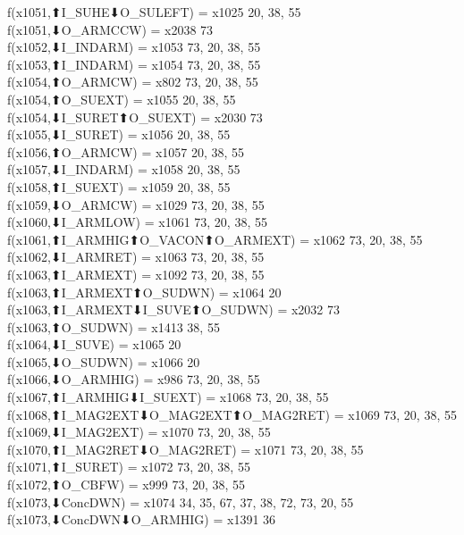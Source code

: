 f(x1051,⬆I_SUHE⬇O_SULEFT) = x1025 {20, 38, 55} \\
f(x1051,⬇O_ARMCCW) = x2038 {73} \\
f(x1052,⬇I_INDARM) = x1053 {73, 20, 38, 55} \\
f(x1053,⬆I_INDARM) = x1054 {73, 20, 38, 55} \\
f(x1054,⬆O_ARMCW) = x802 {73, 20, 38, 55} \\
f(x1054,⬆O_SUEXT) = x1055 {20, 38, 55} \\
f(x1054,⬇I_SURET⬆O_SUEXT) = x2030 {73} \\
f(x1055,⬇I_SURET) = x1056 {20, 38, 55} \\
f(x1056,⬆O_ARMCW) = x1057 {20, 38, 55} \\
f(x1057,⬇I_INDARM) = x1058 {20, 38, 55} \\
f(x1058,⬆I_SUEXT) = x1059 {20, 38, 55} \\
f(x1059,⬇O_ARMCW) = x1029 {73, 20, 38, 55} \\
f(x1060,⬇I_ARMLOW) = x1061 {73, 20, 38, 55} \\
f(x1061,⬆I_ARMHIG⬆O_VACON⬆O_ARMEXT) = x1062 {73, 20, 38, 55} \\
f(x1062,⬇I_ARMRET) = x1063 {73, 20, 38, 55} \\
f(x1063,⬆I_ARMEXT) = x1092 {73, 20, 38, 55} \\
f(x1063,⬆I_ARMEXT⬆O_SUDWN) = x1064 {20} \\
f(x1063,⬆I_ARMEXT⬇I_SUVE⬆O_SUDWN) = x2032 {73} \\
f(x1063,⬆O_SUDWN) = x1413 {38, 55} \\
f(x1064,⬇I_SUVE) = x1065 {20} \\
f(x1065,⬇O_SUDWN) = x1066 {20} \\
f(x1066,⬇O_ARMHIG) = x986 {73, 20, 38, 55} \\
f(x1067,⬆I_ARMHIG⬇I_SUEXT) = x1068 {73, 20, 38, 55} \\
f(x1068,⬆I_MAG2EXT⬇O_MAG2EXT⬆O_MAG2RET) = x1069 {73, 20, 38, 55} \\
f(x1069,⬇I_MAG2EXT) = x1070 {73, 20, 38, 55} \\
f(x1070,⬆I_MAG2RET⬇O_MAG2RET) = x1071 {73, 20, 38, 55} \\
f(x1071,⬆I_SURET) = x1072 {73, 20, 38, 55} \\
f(x1072,⬆O_CBFW) = x999 {73, 20, 38, 55} \\
f(x1073,⬇ConcDWN) = x1074 {34, 35, 67, 37, 38, 72, 73, 20, 55} \\
f(x1073,⬇ConcDWN⬇O_ARMHIG) = x1391 {36} \\
